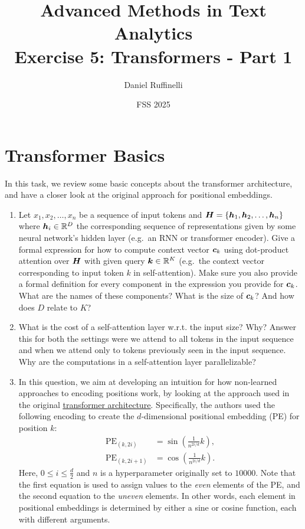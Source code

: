 \documentclass[11pt,a4paper]{article}
\title{Advanced Methods in Text Analytics \\ 
Exercise 5: Transformers - Part 1}
\author{Daniel Ruffinelli}
\date{FSS 2025}
\begin{document}
\maketitle

\section{Transformer Basics}

In this task, we review some basic concepts about the transformer architecture,
and have a closer look at the original approach for positional embeddings.

\begin{enumerate}[label=(\alph*)]
    \item Let $x_1,x_2,\ldots, x_n$ be a sequence of input tokens and
          ${\boldsymbol{H}} = \{{\boldsymbol{h}}_1,{\boldsymbol{h}}_2,\ldots, {\boldsymbol{h}}_n\}$ where ${\boldsymbol{h}}_i\in\mathbb{R}^D$ the
          corresponding sequence of representations given by some neural
          network's hidden layer (e.g.\ an RNN or transformer encoder).
          Give a formal expression for how to compute context vector ${\boldsymbol{c}}_k$
          using dot-product attention over ${\boldsymbol{H}}$ with given query
          ${\boldsymbol{k}}\in\mathbb{R}^K$ (e.g.\ the context vector corresponding to input
          token $k$ in self-attention).
          Make sure you also provide a formal definition for every component in
          the expression you provide for ${\boldsymbol{c}}_k$.
          What are the names of these components? What is the size of ${\boldsymbol{c}}_k$?
          And how does $D$ relate to $K$?
    \item What is the cost of a self-attention layer w.r.t. the input size?
          Why? Answer this for both the settings were we attend to all tokens in
          the input sequence and when we attend only to tokens previously seen
          in the input sequence.
          Why are the computations in a self-attention layer parallelizable?
    \item In this question, we aim at developing an intuition for how
          non-learned approaches to encoding positions work, by looking at the
          approach used in the original
          \href{https://arxiv.org/pdf/1706.03762.pdf}{\underline{transformer architecture}}.
          Specifically, the authors used the following encoding to create the
          $d$-dimensional positional embedding (PE) for position $k$:
          \begin{align*}
              \operatorname{PE}_{(k,2i)}   & = \sin\left(\frac{1}{n^{2i/d}}k\right), \\
              \operatorname{PE}_{(k,2i+1)} & = \cos\left(\frac{1}{n^{2i/d}}k\right).
          \end{align*}
          Here, $0\leq i \leq \frac{d}{2}$ and $n$ is a hyperparameter originally
          set to $10000$.
          Note that the first equation is used to assign values to the
          \emph{even} elements of the PE, and the second equation to the
          \emph{uneven} elements.
          In other words, each element in positional embeddings is determined
          by either a sine or cosine function, each with different arguments.


\end{enumerate}
\end{document}

